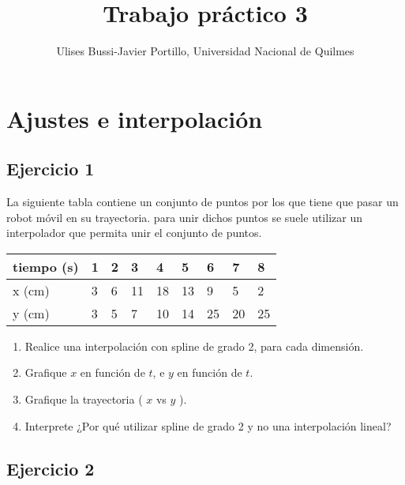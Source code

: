\documentclass[a4paper,11pt]{article}
\makeatletter
\theoremstyle{mytheor}
\renewcommand{\maketitle}{
\colorbox{gray!20}{\framebox[\linewidth]{ \huge \textsc{\@title} } 
\lfoot{\@title}
}

}
\makeatother
\begin{document}
\title{Trabajo práctico 3}

\author{Ulises Bussi-Javier Portillo, Universidad Nacional de Quilmes}


\maketitle \vspace{20pt}



\section*{Ajustes e interpolación}

\subsection*{Ejercicio 1}
La siguiente tabla contiene un conjunto de puntos por los que tiene que pasar
un robot móvil en su trayectoria. para unir dichos puntos se suele utilizar
un interpolador que permita unir el conjunto de puntos. 

\begin{table}[h!]
\centering
\begin{tabular}{l|llllllll}
 \hline
 tiempo (s)   & 1	 &  2    &  3   &  4    &  5    &   6   &   7   &  8     \\ \hline
 x (cm) 	  & 3    &  6    &  11  &  18   & 13    &   9   &   5   &  2    \\ \hline
 y (cm) 	  & 3    &  5    &  7  &  10   & 14    &   25   &  20   &  25    \\ \hline
\end{tabular}
\end{table}


\begin{enumerate}[label=\alph*)]
  \item Realice una interpolación con spline de grado 2, para cada dimensión.
  \item Grafique $x$ en función de $t$, e $y$ en función de $t$.
  \item Grafique la trayectoria  ( $x$ vs $y$ ).
  \item Interprete ¿Por qué utilizar spline de grado 2 y no una interpolación lineal?
\end{enumerate} 

\subsection*{Ejercicio 2} 
\end{document}
